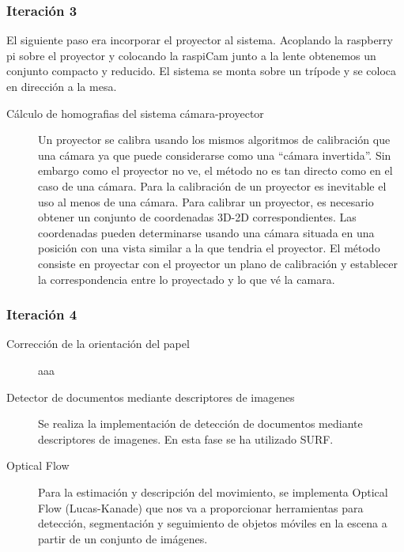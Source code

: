 \subsubsection{Iteración 3}
El siguiente paso era incorporar el proyector al sistema. Acoplando la raspberry pi sobre el proyector y colocando la raspiCam junto a la lente obtenemos un conjunto compacto y reducido. El sistema se monta sobre un trípode y se coloca en dirección a la mesa.



\begin{description}
\item [Cálculo de homografias del sistema cámara-proyector] Un proyector se calibra usando los mismos algoritmos de calibración que una cámara ya que puede considerarse como una ``cámara invertida''. Sin embargo como el proyector no ve, el método no es tan directo como en el caso de una cámara.
Para la calibración de un proyector es inevitable el uso al menos de una cámara. Para calibrar un proyector, es necesario obtener un conjunto de coordenadas 3D-2D correspondientes. Las coordenadas pueden determinarse usando una cámara situada en una posición con una vista similar a la que tendria el proyector. El método consiste en proyectar con el proyector un plano de calibración y establecer la correspondencia entre lo proyectado y lo que vé la camara.
\end{description}
\subsubsection{Iteración 4}

\begin{description}
\item [Corrección de la orientación del papel] aaa
\item [Detector de documentos mediante descriptores de imagenes] Se realiza la implementación de detección de documentos mediante descriptores de imagenes. En esta fase se ha utilizado SURF.
\item [Optical Flow] Para la estimación y descripción del movimiento, se implementa Optical Flow  (Lucas-Kanade) que nos va a proporcionar herramientas para detección, segmentación y seguimiento de  objetos móviles en la escena a partir de un conjunto de imágenes. 
\end{description}

